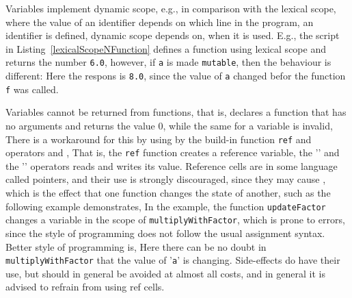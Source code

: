Variables implement dynamic scope, e.g., in comparison with the lexical scope, where the value of an identifier depends on which line in the program, an identifier is defined, dynamic scope depends on, when it is used. E.g., the script in Listing~\ref{lexicalScopeNFunction} defines a function using lexical scope and returns the number \lstinline!6.0!, however, if \lstinline!a! is made \lstinline!mutable!, then the behaviour is different:
%
%
Here the respons is \lstinline!8.0!, since the value of \lstinline!a! changed befor the function \lstinline!f! was called.
 
Variables cannot be returned from functions, that is,
%
%
declares a function that has no arguments and returns the value 0, while the same for a variable is invalid,
%
%
There is a workaround for this by using  by the build-in function \texttt{ref} and operators \token{!} and \token{:=},
%
%
That is, the \texttt{ref} function creates a reference variable, the '\token{!}' and the '\token{:=}' operators reads and writes its value. Reference cells are in some language called pointers, and their use is strongly discouraged, since they may cause , which is the effect that one function changes the state of another, such as the following example demonstrates,
%
%
In the example, the function \texttt{updateFactor} changes a variable in the scope of \texttt{multiplyWithFactor}, which is prone to errors, since the style of programming does not follow the usual assignment syntax. Better style of programming is,
%
%
Here there can be no doubt in \texttt{multiplyWithFactor} that the value of '\texttt{a}' is changing. Side-effects do have their use, but should in general be avoided at almost all costs, and in general it is advised to refrain from using ref cells.



